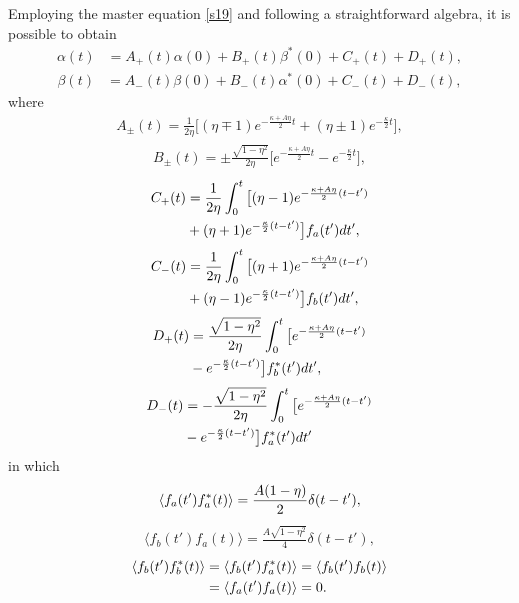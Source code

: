 \documentclass[twocolumn,showpacs,preprintnumbers,amsmath,amssymb,pra]{revtex4}
\begin{document}
Employing the master equation \eqref{s19} and following a straightforward algebra, it is possible to obtain
\cite{pra74043816,pra77013815}
\begin{align}\label{s20}\alpha(t)& = A_{+}(t)\alpha(0) +
B_{+}(t)\beta^{*}(0) + C_{+}(t)+D_{+}(t),\end{align}
\begin{align}\label{s21}\beta(t) &= A_{-}(t)\beta(0) +
B_{-}(t)\alpha^{*}(0) + C_{-}(t)+D_{-}(t),\end{align} where
 \begin{align}\label{s22}A_{\pm}(t) = \frac{1}{2\eta}\big[(\eta\mp1)e^{-\frac{\kappa+A\eta}{2}t} + (\eta\pm1)e^{-\frac{\kappa}{2}t}\big],\end{align}
 \begin{align}\label{s23}B_{\pm}(t) = \pm\frac{\sqrt{1-\eta^{2}}}{2\eta}\big[e^{-\frac{\kappa+A\eta}{2}t} -
 e^{-\frac{\kappa}{2}t}\big],\end{align}
\begin{align}\label{s24}C_{+}(t) &=
\frac{1}{2\eta}\int_{0}^{t}\big[(\eta-1)e^{-\frac{\kappa+A\eta}{2}(t-t')}
\notag\\&+ (\eta +1)e^{-\frac{\kappa}{2}(t-t')}\big]
f_{a}(t')dt',\end{align}
\begin{align}\label{s25}C_{-}(t) &=
\frac{1}{2\eta}\int_{0}^{t}\big[(\eta+1)e^{-\frac{\kappa+A\eta}{2}(t-t')}
\notag\\&+ (\eta -1)e^{-\frac{\kappa}{2}(t-t')}\big]
f_{b}(t')dt',\end{align}
\begin{align}\label{s26}D_{+}(t) &=
\frac{\sqrt{1-\eta^{2}}}{2\eta}\int_{0}^{t}\big[e^{-\frac{\kappa+A\eta}{2}(t-t')}
\notag\\&- e^{-\frac{\kappa}{2}(t-t')}\big]
f_{b}^{*}(t')dt',\end{align} 
\begin{align}\label{s27}D_{-}(t) &=
-\frac{\sqrt{1-\eta^{2}}}{2\eta}\int_{0}^{t}\big[e^{-\frac{\kappa+A\eta}{2}(t-t')}
\notag\\&- e^{-\frac{\kappa}{2}(t-t')}\big]
f_{a}^{*}(t')dt'\end{align} in which
\begin{align}\label{s28}\langle
f_{a}(t')f^{*}_{a}(t)\rangle =
{A(1-\eta)\over2}\delta(t-t'),\end{align}
\begin{align}\label{s29}\langle f_{b}(t')f_{a}(t)\rangle=
\frac{A\sqrt{1-\eta^{2}}}{4}\delta(t-t'),\end{align}
\begin{align}\label{s30}\langle f_{b}(t')f^{*}_{b}(t)\rangle &=\langle
f_{b}(t')f^{*}_{a}(t)\rangle =\langle f_{b}(t')f_{b}(t)\rangle
\notag\\&=\langle f_{a}(t')f_{a}(t)\rangle = 0.\end{align}
\end{document}
